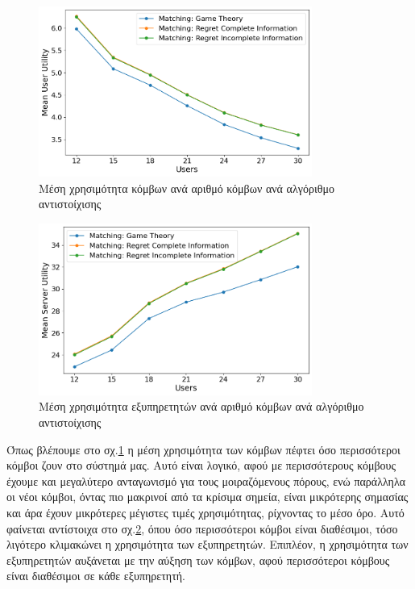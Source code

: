 \begin{figure}[H]
    \centering
    \includegraphics[width=0.8\textwidth]{figures/chapter4/Mean_User_Utility_vs_Users.png}
    \caption{Μέση χρησιμότητα κόμβων ανά αριθμό κόμβων ανά αλγόριθμο αντιστοίχισης}
    \label{fig37}
\end{figure}

\begin{figure}[H]
    \centering
    \includegraphics[width=0.8\textwidth]{figures/chapter4/Mean_Server_Utility_vs_Users.png}
    \caption{Μέση χρησιμότητα εξυπηρετητών ανά αριθμό κόμβων ανά αλγόριθμο αντιστοίχισης}
    \label{fig38}
\end{figure}

\newpage

Όπως βλέπουμε στο σχ.\ref{fig37} η μέση χρησιμότητα των κόμβων πέφτει όσο περισσότεροι κόμβοι ζουν στο σύστημά μας. Αυτό είναι λογικό, αφού με περισσότερους κόμβους έχουμε και μεγαλύτερο ανταγωνισμό για τους μοιραζόμενους πόρους, ενώ παράλληλα οι νέοι κόμβοι, όντας πιο μακρινοί από τα κρίσιμα σημεία, είναι μικρότερης σημασίας και άρα έχουν μικρότερες μέγιστες τιμές χρησιμότητας, ρίχνοντας το μέσο όρο. Αυτό φαίνεται αντίστοιχα στο σχ.\ref{fig38}, όπου όσο περισσότεροι κόμβοι είναι διαθέσιμοι, τόσο λιγότερο κλιμακώνει η χρησιμότητα των εξυπηρετητών. Επιπλέον, η χρησιμότητα των εξυπηρετητών αυξάνεται με την αύξηση των κόμβων, αφού περισσότεροι κόμβους είναι διαθέσιμοι σε κάθε εξυπηρετητή.

